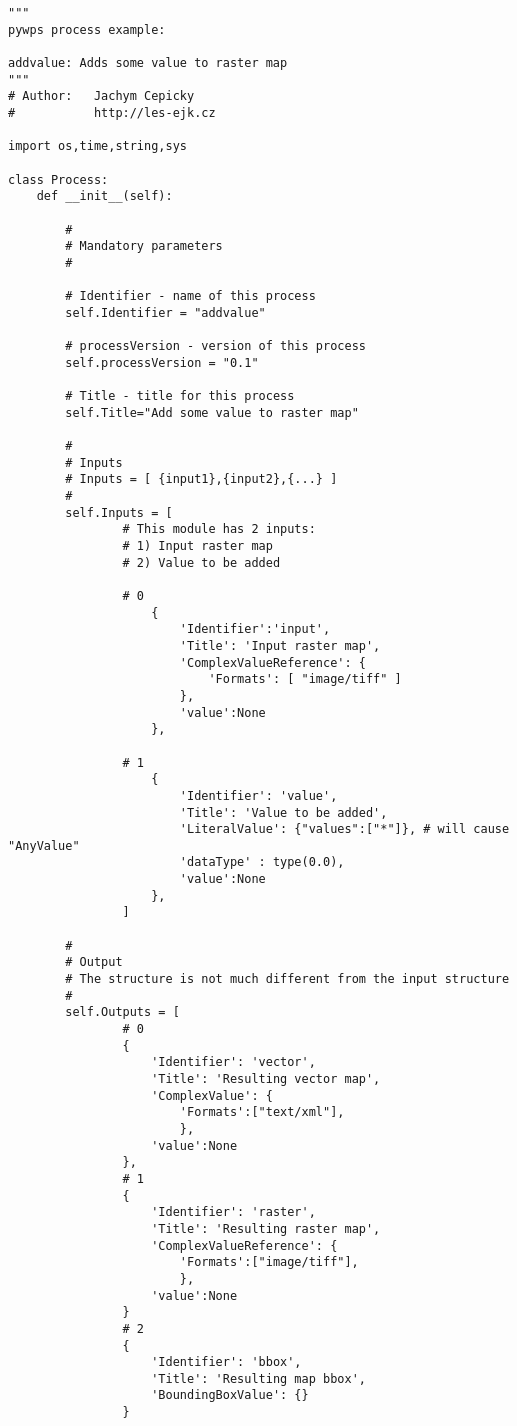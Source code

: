 \documentclass[a4paper,11pt]{article}
\begin{document}
    \begin{verbatim}
"""
pywps process example:

addvalue: Adds some value to raster map
"""
# Author:	Jachym Cepicky
#        	http://les-ejk.cz

import os,time,string,sys

class Process:
    def __init__(self):

        # 
        # Mandatory parameters
        # 

        # Identifier - name of this process
        self.Identifier = "addvalue"

        # processVersion - version of this process
        self.processVersion = "0.1"

        # Title - title for this process
        self.Title="Add some value to raster map"

        #
        # Inputs
        # Inputs = [ {input1},{input2},{...} ]
        #
        self.Inputs = [
                # This module has 2 inputs: 
                # 1) Input raster map
                # 2) Value to be added

                # 0
                    {
                        'Identifier':'input',
                        'Title': 'Input raster map',
                        'ComplexValueReference': {
                            'Formats': [ "image/tiff" ]
                        },
                        'value':None
                    },

                # 1
                    {
                        'Identifier': 'value',
                        'Title': 'Value to be added',
                        'LiteralValue': {"values":["*"]}, # will cause "AnyValue"
                        'dataType' : type(0.0), 
                        'value':None
                    },
                ]

        #
        # Output
        # The structure is not much different from the input structure
        #
        self.Outputs = [
                # 0
                {
                    'Identifier': 'vector',
                    'Title': 'Resulting vector map',
                    'ComplexValue': {
                        'Formats':["text/xml"],
                        },
                    'value':None
                },
                # 1
                {
                    'Identifier': 'raster',
                    'Title': 'Resulting raster map',
                    'ComplexValueReference': {
                        'Formats':["image/tiff"],
                        },
                    'value':None
                }
                # 2
                {
                    'Identifier': 'bbox',
                    'Title': 'Resulting map bbox',
                    'BoundingBoxValue': {}
                }



\end{verbatim}
\end{document}

